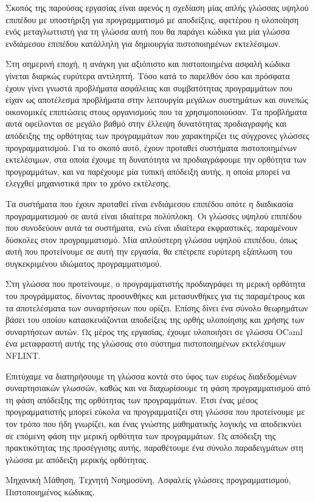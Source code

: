 \documentclass[diploma]{softlab-thesis}
\begin{document}
\begin{abstractgr}%
  Σκοπός της παρούσας εργασίας είναι αφενός η σχεδίαση μίας απλής
  γλώσσας υψηλού επιπέδου με υποστήριξη για προγραμματισμό με
  αποδείξεις, αφετέρου η υλοποίηση ενός μεταγλωττιστή για τη γλώσσα
  αυτή που θα παράγει κώδικα για μία γλώσσα ενδιάμεσου επιπέδου
  κατάλληλη για δημιουργία πιστοποιημένων εκτελέσιμων.

  Στη σημερινή εποχή, η ανάγκη για αξιόπιστο και πιστοποιημένα ασφαλή
  κώδικα γίνεται διαρκώς ευρύτερα αντιληπτή. Τόσο κατά το παρελθόν όσο
  και πρόσφατα έχουν γίνει γνωστά προβλήματα ασφάλειας και
  συμβατότητας προγραμμάτων που είχαν ως αποτέλεσμα προβλήματα στην
  λειτουργία μεγάλων συστημάτων και συνεπώς οικονομικές επιπτώσεις
  στους οργανισμούς που τα χρησιμοποιούσαν. Τα προβλήματα αυτά
  οφείλονται σε μεγάλο βαθμό στην έλλειψη δυνατότητας προδιαγραφής και
  απόδειξης της ορθότητας των προγραμμάτων που χαρακτηρίζει τις
  σύγχρονες γλώσσες προγραμματισμού. Για το σκοπό αυτό, έχουν προταθεί
  συστήματα πιστοποιημένων εκτελέσιμων, στα οποία έχουμε τη δυνατότητα
  να προδιαγράφουμε την ορθότητα των προγραμμάτων, και να παρέχουμε
  μία τυπική απόδειξη αυτής, η οποία μπορεί να ελεγχθεί μηχανιστικά
  πριν το χρόνο εκτέλεσης.

  Τα συστήματα που έχουν προταθεί είναι ενδιάμεσου επιπέδου οπότε η
  διαδικασία προγραμματισμού σε αυτά είναι ιδιαίτερα πολύπλοκη. Οι
  γλώσσες υψηλού επιπέδου που συνοδεύουν αυτά τα συστήματα, ενώ είναι
  ιδιαίτερα εκφραστικές, παραμένουν δύσκολες στον προγραμματισμό.  Μία
  απλούστερη γλώσσα υψηλού επιπέδου, όπως αυτή που προτείνουμε σε αυτή
  την εργασία, θα επέτρεπε ευρύτερη εξάπλωση του συγκεκριμένου
  ιδιώματος προγραμματισμού.

  Στη γλώσσα που προτείνουμε, ο προγραμματιστής προδιαγράφει τη μερική
  ορθότητα του προγράμματος, δίνοντας προσυνθήκες και μετασυνθήκες για
  τις παραμέτρους και τα αποτελέσματα των συναρτήσεων που ορίζει.
  Επίσης δίνει ένα σύνολο θεωρημάτων βάσει του οποίου κατασκευάζονται
  αποδείξεις της ορθής υλοποίησης και χρήσης των συναρτήσεων αυτών. Ως
  μέρος της εργασίας, έχουμε υλοποιήσει σε γλώσσα OCaml ένα
  μεταφραστή αυτής της γλώσσας στο σύστημα πιστοποιημένων
  εκτελέσιμων NFLINT.

  Επιτύχαμε να διατηρήσουμε τη γλώσσα κοντά στο ύφος των ευρέως
  διαδεδομένων συναρτησιακών γλωσσών, καθώς και να διαχωρίσουμε τη
  φάση προγραμματισμού από τη φάση απόδειξης της ορθότητας των
  προγραμμάτων. Έτσι ένας μέσος προγραμματιστής μπορεί εύκολα να
  προγραμματίζει στη γλώσσα που προτείνουμε με τον τρόπο που ήδη
  γνωρίζει, και ένας γνώστης μαθηματικής λογικής να αποδεικνύει σε
  επόμενη φάση την μερική ορθότητα των προγραμμάτων. Ως απόδειξη της
  πρακτικότητας της προσέγγισης αυτής, παραθέτουμε ένα σύνολο
  παραδειγμάτων στη γλώσσα με απόδειξη μερικής ορθότητας.
\begin{keywordsgr}
  Μηχανική Μάθηση,
  Τεχνητή Νοημοσύνη,
  Ασφαλείς γλώσσες προγραμματισμού,
  Πιστοποιημένος κώδικας.
\end{keywordsgr}
\end{abstractgr}
\end{document}
